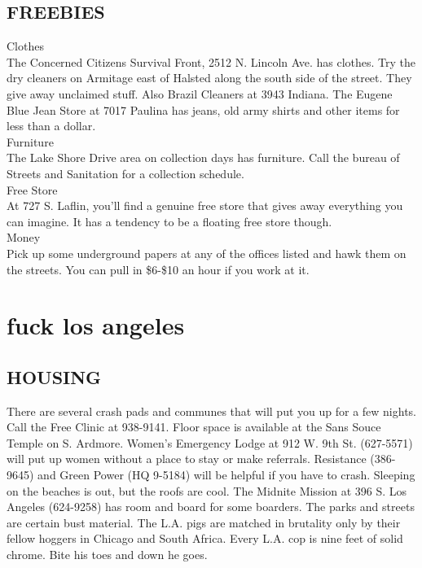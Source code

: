 \documentclass[11pt,twoside,a4paper]{book}
\begin{document}
\subsection{FREEBIES}
Clothes~\\
The Concerned Citizens Survival Front, 2512 N. Lincoln Ave. has clothes. Try the dry cleaners on Armitage east of Halsted along the south side of the street. They give away unclaimed stuff. Also Brazil Cleaners at 3943 Indiana. The Eugene Blue Jean Store at 7017 Paulina has jeans, old army shirts and other items for less than a dollar.~\\

Furniture~\\
The Lake Shore Drive area on collection days has furniture. Call the bureau of Streets and Sanitation for a collection schedule.~\\

Free Store~\\
At 727 S. Laflin, you'll find a genuine free store that gives away everything you can imagine. It has a tendency to be a floating free store though.~\\

Money~\\
Pick up some underground papers at any of the offices listed and hawk them on the streets. You can pull in \$6-\$10 an hour if you work at it.~\\

\section{fuck los angeles}

\subsection{HOUSING}
There are several crash pads and communes that will put you up for a few nights. Call the Free Clinic at 938-9141. Floor space is available at the Sans Souce Temple on S. Ardmore. Women's Emergency Lodge at 912 W. 9th	St. (627-5571) will put up women without a place to stay or make referrals. Resistance (386-9645) and Green Power (HQ 9-5184) will be helpful if you have to crash. Sleeping on the beaches is out, but the roofs are cool. The Midnite Mission at 396 S. Los Angeles (624-9258) has room and board for some boarders. The parks and streets are certain bust material. The L.A. pigs are matched in brutality only by their fellow hoggers in Chicago and South Africa. Every L.A. cop is nine feet of solid chrome. Bite his toes and down he goes.~\\
\end{document}
